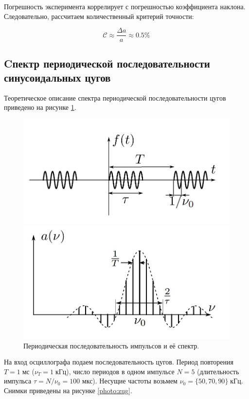 Погрешность эксперимента коррелирует с погрешностью коэффициента наклона. Следовательно, рассчитаем количественный критерий точности:

$$\mathcal{C} \approx \frac{\Delta a}{a} \approx 0.5 \% $$

\subsection*{Cпектр периодической последовательности синусоидальных цугов}

Теоретическое описание спектра периодической последовательности цугов приведено на рисунке \ref{res:zug}.

\begin{figure}[H]
	\centering
	\begin{minipage}[b]{.49\textwidth}
		\centering
		\includegraphics[width=0.9\linewidth]{"../res/zug"}
	\end{minipage}%
	\begin{minipage}[b]{.49\textwidth}
		\centering
		\includegraphics[width=0.9\linewidth]{"../res/zug_spectrum"}
	\end{minipage}
	\caption{Периодическая последовательность импульсов и её спектр.}
	\label{res:zug}
\end{figure}

На вход осциллографа подаем последовательность цугов. Период повторения $T = 1 \; \text{мс}$ ($\nu_T = 1 \; \text{кГц}$), число периодов в одном импульсе $N = 5$ (длительность импульса $\tau = N/\nu_{0} = 100$ мкс). Несущие частоты возьмем $\nu_0 = \{50, 70, 90\} \; \text{кГц}$. Снимки приведены на рисунке \ref{photo:zug}.

